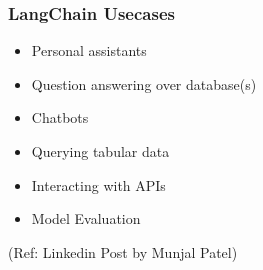 \begin{frame}[fragile]
\begin{frame}[fragile]







				  



\begin{frame}\frametitle{LangChain Usecases}

\begin{itemize}
\item Personal assistants
\item Question answering over database(s)
\item Chatbots
\item Querying tabular data
\item Interacting with APIs
\item Model Evaluation
\end{itemize}


{\tiny (Ref: Linkedin Post by Munjal Patel)}
\end{frame}



\end{frame}
\end{frame}
